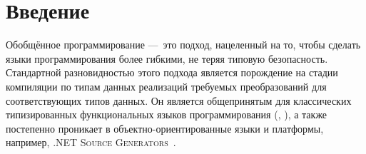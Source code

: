 \section{Введение}


Обобщённое программирование ---~это подход, нацеленный на то, чтобы сделать языки программирования более гибкими, не теряя типовую безопасность. 
Стандартной разновидностью этого подхода является порождение на стадии компиляции по типам данных реализаций требуемых преобразований для соответствующих типов данных. Он является общепринятым для классических типизированных функциональных языков программирования (\ocaml{}, \haskell{}), а также постепенно проникает в объектно-ориентированные языки и платформы, например, \textsc{.NET Source Generators}~\cite{dotNetSG}.


\begin{comment}
При разработке программного обеспечения на функциональных языках программирования, зачастую бывает необходимо реализовывать однотипные преобразования для различных структур данных. Для динамически типизированных языков (например, \scheme{} и его диалекты) иногда можно реализовать одну функцию-метапреобразование, подходящую для всех структур данных. В языках, среды исполнения которых содержат информацию о типах (например, \Scala{}), порою возможно построить метапреобразования во время исполнения, полагаясь на анализ типов во время исполнения (интроспеция) и создание новых типов данных на лету (рефлексия). 
 Для статически типизированных языков программирования, в средах исполнения которых информация о типах обычно не доступна во время исполнения (например, \ocaml{} и \haskell{}), применяется подход под названием 
\emph{обобщенное (generic) программирование}~\cite{Yallop,PPXLib}: 
на стадии компиляции  по описанию типа данных автоматически генерируется нужные преобразования, специализированные для указанных типов данных. 
Обобщённое программирование является стандартным подходом для этих языков, поэтому различным его модификациям крайне желательно, как минимум, повторять его функциональность, а также предоставлять такой же интерфейс использования, чтобы выглядеть знакомыми и понятными практикующему разработчику.

\end{comment}

